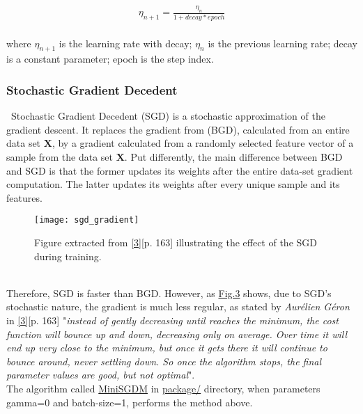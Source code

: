\begin{align*}
\eta_{n+1} = \frac{\eta_n}{1 + decay * epoch}
\end{align*}\\

\noindent where $\eta_{n+1}$ is the learning rate with decay; $\eta_n$ is the previous learning rate; decay is a constant parameter; epoch is the step index.

\subsubsection{Stochastic Gradient Decedent}
\label{chap:Stochastic Gradient Decedent}

\qquad \, Stochastic Gradient Decedent (SGD) is a stochastic approximation of the gradient descent. It replaces the gradient from (BGD), calculated from an entire data set $\boldsymbol{X}$, by a gradient calculated from a randomly selected feature vector of a sample from the data set $\boldsymbol{X}$. Put differently, the main difference between BGD and SGD is that the former updates its weights after the entire data-set gradient computation. The latter updates its weights after every unique sample and its features.\\

\begin{figure}[H]
\label{fig:fig3}
\centering
\texttt{[image: sgd\_gradient]}
\caption{Figure extracted from \hyperref[Bib:Hands-on Machine Learning]{[3]}[p. 163] illustrating the effect of the SGD during training.}
\end{figure}\\

Therefore, SGD is faster than BGD. However, as \hyperref[fig:fig3]{Fig.3} shows, due to SGD's stochastic nature, the gradient is much less regular, as stated by \textit{Aurélien Géron} in \hyperref[Bib:Hands-on Machine Learning]{[3]}[p. 163] "\textit{instead of gently decreasing until reaches the minimum, the cost function will bounce up and down, decreasing only on average. Over time it will end up very close to the minimum, but once it gets there it will continue to bounce around, never settling down. So once the algorithm stops, the final parameter values are good, but not optimal}".\\

The algorithm called \href{https://github.com/fabiorodp/UiO-FYS-STK4155/blob/master/Project2/package/gradient_descent.py}{MiniSGDM} in \href{https://github.com/fabiorodp/UiO-FYS-STK4155/blob/master/Project2/package/}{package/} directory, when parameters gamma=0 and batch-size=1, performs the method above.\\


